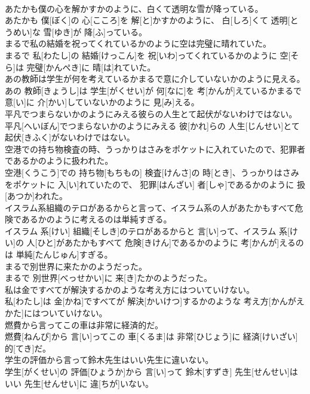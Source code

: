 \documentclass[8pt]{extreport}
\begin{document}
\begin{CJK}{UTF8}{min}
\\	あたかも僕の心を解かすかのように、白くて透明な雪が降っている。	
\\	あたかも 僕[ぼく]の 心[こころ]を 解[と]かすかのように、 白[しろ]くて 透明[とうめい]な 雪[ゆき]が 降[ふ]っている。
\\	まるで私の結婚を祝ってくれているかのように空は完璧に晴れていた。	
\\	まるで 私[わたし]の 結婚[けっこん]を 祝[いわ]ってくれているかのように 空[そら]は 完璧[かんぺき]に 晴[は]れていた。
\\	あの教師は学生が何を考えているかまるで意に介していないかのように見える。	
\\	あの 教師[きょうし]は 学生[がくせい]が 何[なに]を 考[かんが]えているかまるで 意[い]に 介[かい]していないかのように 見[み]える。
\\	平凡でつまらないかのようにみえる彼らの人生とて起伏がないわけではない。	
\\	平凡[へいぼん]でつまらないかのようにみえる 彼[かれ]らの 人生[じんせい]とて 起伏[きふく]がないわけではない。
\\	空港での持ち物検査の時、うっかりはさみをポケットに入れていたので、犯罪者であるかのように扱われた。	
\\	空港[くうこう]での 持ち物[もちもの] 検査[けんさ]の 時[とき]、うっかりはさみをポケットに 入[い]れていたので、 犯罪[はんざい] 者[しゃ]であるかのように 扱[あつか]われた。
\\	イスラム系組織のテロがあるからと言って、イスラム系の人があたかもすべて危険であるかのように考えるのは単純すぎる。	
\\	イスラム 系[けい] 組織[そしき]のテロがあるからと 言[い]って、イスラム 系[けい]の 人[ひと]があたかもすべて 危険[きけん]であるかのように 考[かんが]えるのは 単純[たんじゅん]すぎる。
\\	まるで別世界に来たかのようだった。	
\\	まるで 別世界[べっせかい]に 来[き]たかのようだった。
\\	私は金ですべてが解決するかのような考え方にはついていけない。	
\\	私[わたし]は 金[かね]ですべてが 解決[かいけつ]するかのような 考え方[かんがえかた]にはついていけない。
\\	燃費から言ってこの車は非常に経済的だ。	
\\	燃費[ねんぴ]から 言[い]ってこの 車[くるま]は 非常[ひじょう]に 経済[けいざい] 的[てき]だ。
\\	学生の評価から言って鈴木先生はいい先生に違いない。	
\\	学生[がくせい]の 評価[ひょうか]から 言[い]って 鈴木[すずき] 先生[せんせい]はいい 先生[せんせい]に 違[ちが]いない。

\end{CJK}
\end{document}
